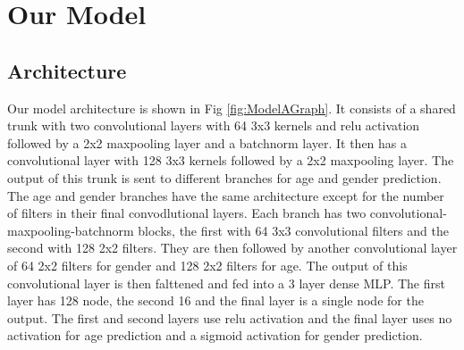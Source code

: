 





\section{Our Model}


\subsection{Architecture}
Our model architecture is shown in Fig \ref{fig:ModelAGraph}. It consists of a shared trunk with two convolutional 
layers with 64 3x3 kernels and relu activation followed by a 2x2 maxpooling layer and a batchnorm layer. It then 
has a convolutional layer with 128 3x3 kernels followed by a 2x2 maxpooling layer. The output of this trunk is 
sent to different branches for age and gender prediction. The age and gender branches have the same architecture
except for the number of filters in their final convodlutional layers. Each branch has two 
convolutional-maxpooling-batchnorm blocks, the first with 64 3x3 convolutional filters and the second with 
128 2x2 filters. They are then followed by another convolutional layer of 64 2x2 filters for gender and 128 2x2 
filters for age. The output of this convolutional layer is then falttened and fed into a 3 layer dense MLP. The first
layer has 128 node, the second 16 and the final layer is a single node for the output. The first and second layers 
use relu activation and the final layer uses no activation for age prediction and a sigmoid activation for gender 
prediction.

